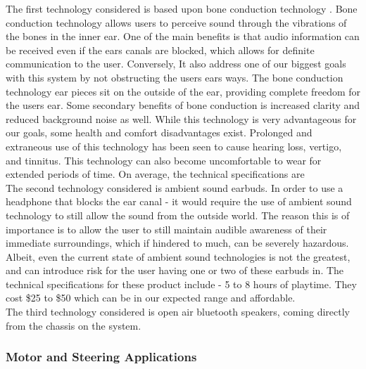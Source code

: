 \noindent The first technology considered is based upon bone conduction technology \cite{BoneConductionRef}. Bone conduction technology allows users to perceive sound through the vibrations of the bones in the inner ear. One of the main benefits is that audio information can be received even if the ears canals are blocked, which allows for definite communication to the user. Conversely, It also address one of our biggest goals with this system by not obstructing the users ears ways. The bone conduction technology ear pieces sit on the outside of the ear, providing complete freedom for the users ear. Some secondary benefits of bone conduction is increased clarity and reduced background noise as well. While this technology is very advantageous for our goals, some health and comfort disadvantages exist. Prolonged and extraneous use of this technology has been seen to cause hearing loss, vertigo, and tinnitus. This technology can also become uncomfortable to wear for extended periods of time. On average, the technical specifications are \\

\noindent The second technology considered is ambient sound earbuds. In order to use a headphone that blocks the ear canal - it would require the use of ambient sound technology to still allow the sound from the outside world. The reason this is of importance is to allow the user to still maintain audible awareness of their immediate surroundings, which if hindered to much, can be severely hazardous. Albeit, even the current state of ambient sound technologies is not the greatest, and can introduce risk for the user having one or two of these earbuds in. The technical  specifications for these product include - 5 to 8 hours of playtime. They cost \$25 to \$50 which can be in our expected range and affordable. \\

\noindent The third technology considered is open air bluetooth speakers, coming directly from the chassis on the system. \\


\subsubsection{Motor and Steering Applications} 

